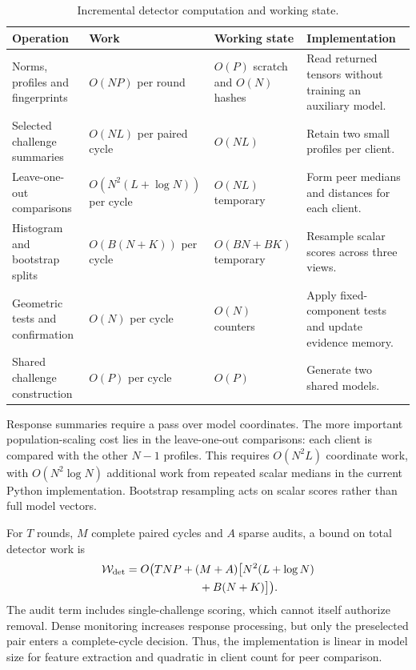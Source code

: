 \documentclass[conference]{IEEEtran}
\begin{document}
\begin{table}[t]\centering\footnotesize
\caption{Incremental detector computation and working state.}\label{tab:complexity}
\begin{tabular}{>{\raggedright\arraybackslash}p{3.6cm}>{\raggedright\arraybackslash}p{3.6cm}>{\raggedright\arraybackslash}p{3.0cm}>{\raggedright\arraybackslash}p{5.3cm}}\toprule
Operation & Work & Working state & Implementation \\ \midrule
Norms, profiles and fingerprints & $O(NP)$ per round & $O(P)$ scratch and $O(N)$ hashes & Read returned tensors without training an auxiliary model. \\
Selected challenge summaries & $O(NL)$ per paired cycle & $O(NL)$ & Retain two small profiles per client. \\
Leave-one-out comparisons & $O(N^2(L+\log N))$ per cycle & $O(NL)$ temporary & Form peer medians and distances for each client. \\
Histogram and bootstrap splits & $O(B(N+K))$ per cycle & $O(BN+BK)$ temporary & Resample scalar scores across three views. \\
Geometric tests and confirmation & $O(N)$ per cycle & $O(N)$ counters & Apply fixed-component tests and update evidence memory. \\
Shared challenge construction & $O(P)$ per cycle & $O(P)$ & Generate two shared models. \\
\bottomrule\end{tabular}\end{table}

Response summaries require a pass over model coordinates. The more
important population-scaling cost lies in the leave-one-out comparisons:
each client is compared with the other $N-1$ profiles. This requires
$O(N^2L)$ coordinate work, with $O(N^2\log N)$ additional work from
repeated scalar medians in the current Python implementation. Bootstrap
resampling acts on scalar scores rather than full model vectors.

For $T$ rounds, $M$ complete paired cycles and $A$ sparse audits, a bound
on total detector work is
\begin{equation}
\begin{aligned}
 \mathcal W_{\rm det}=O\bigl(&TNP+(M+A)\bigl[N^2(L+\log N)\\
          &\hspace{4em}+B(N+K)\bigr]\bigr).
\end{aligned}
\end{equation}
The audit term includes single-challenge scoring, which cannot itself
authorize removal. Dense monitoring increases response processing, but
only the preselected pair enters a complete-cycle decision.
Thus, the implementation is linear in model size for feature extraction
and quadratic in client count for peer comparison.
\end{document}
